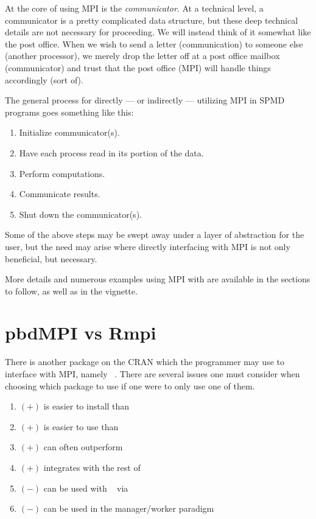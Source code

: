At the core of using MPI is the \emph{communicator}. At a technical level,
a communicator is a pretty complicated data structure, but these deep
technical details are not necessary for proceeding. We will instead think
of it somewhat like the post office. When we wish to send a letter
(communication) to someone else (another processor), we merely drop
the letter off at a post office mailbox (communicator) and trust that
the post office (MPI) will handle things accordingly (sort of).

The general process for directly --- or indirectly --- utilizing MPI in
SPMD programs goes something like this:

\begin{enumerate}
 \item Initialize communicator(s).
 \item Have each process read in its portion of the data.
 \item Perform computations.
 \item Communicate results.
 \item Shut down the communicator(s).
\end{enumerate}

Some of the above steps may be swept away under a layer of abstraction for
the user, but the need may arise where directly interfacing with MPI is not
only beneficial, but necessary.

More details and numerous examples using MPI with  are
available in the sections to follow, as well as in the 
vignette.





\section{pbdMPI vs Rmpi}

There is another package on the CRAN which the  programmer may
use to interface with MPI, namely
~\citep{Yu2002}. There are several issues
one must consider when choosing which package to use if one were to only
use one of them.
\begin{enumerate}
 \item $(+)$  is easier to install than 
 \item $(+)$  is easier to use than 
 \item\label{enum:perf} $(+)$  can often outperform 
 \item\label{enum:integrate} $(+)$  integrates with the rest of
       \pbdR
 \item\label{enum:dompi} $(-)$  can be used with
      ~\citep{foreach} via
      ~\citep{dompi}
 \item $(-)$  can be used in the manager/worker paradigm
\end{enumerate}

